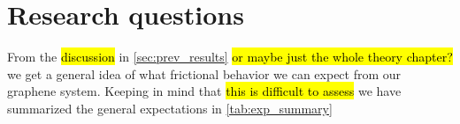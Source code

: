 






\section{Research questions}
From the \hl{discussion} in \cref{sec:prev_results} \hl{or maybe just the whole theory chapter?} we get a general idea of what frictional behavior we can expect from our graphene system. Keeping in mind that \hl{this is difficult to assess} we have summarized the general expectations in \cref{tab:exp_summary}


